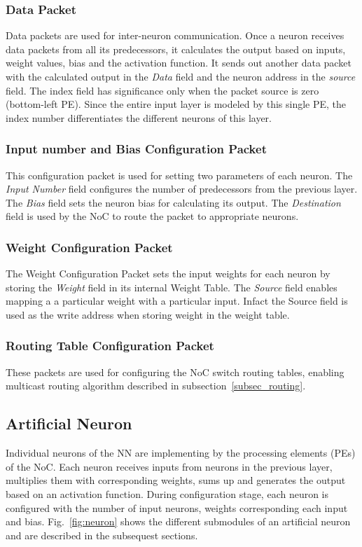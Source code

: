 \subsubsection*{\bf Data Packet}
Data packets are used for inter-neuron communication.
Once a neuron receives data packets from all its predecessors, it calculates the output based on inputs, weight values, bias and the activation function.
It sends out another data packet with the calculated output in the \emph{Data} field and the neuron address in the \emph{source} field.
The index field has significance only when the packet source is zero (bottom-left PE).
Since the entire input layer is modeled by this single PE, the index number differentiates the different neurons of this layer.
\subsubsection*{\bf Input number and Bias Configuration Packet}
This configuration packet is used for setting two parameters of each neuron.
The \emph{Input Number} field configures the number of predecessors from the previous layer.
The \emph{Bias} field sets the neuron bias for calculating its output.
The \emph{Destination} field is used by the NoC to route the packet to appropriate neurons. 
\subsubsection*{\bf Weight Configuration Packet}
The Weight Configuration Packet sets the input weights for each neuron by storing the \emph{Weight} field in its internal Weight Table.
The \emph{Source} field enables mapping a a particular weight with a particular input.
Infact the Source field is used as the write address when storing weight in the weight table.
\subsubsection*{\bf Routing Table Configuration Packet}
These packets are used for configuring the NoC switch routing tables, enabling multicast routing algorithm described in subsection~\ref{subsec_routing}.

\subsection{Artificial Neuron}
Individual neurons of the NN are implementing by the processing elements (PEs) of the NoC.
Each neuron receives inputs from neurons in the previous layer, multiplies them with corresponding weights, sums up and generates the output based on an activation function.
During configuration stage, each neuron is configured with the number of input neurons, weights corresponding each input and bias.
Fig.~\ref{fig:neuron} shows the different submodules of an artificial neuron and are described in the subsequest sections.
